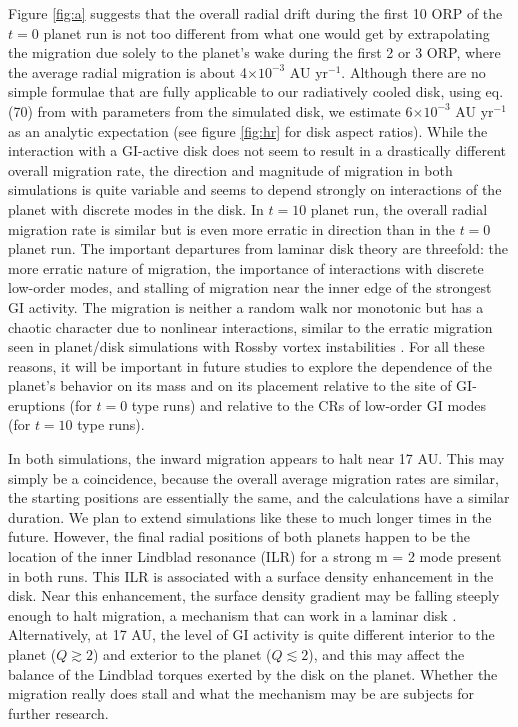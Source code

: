 \documentclass[12pt,manuscript,authoryear]{aastex}
\begin{document}
Figure \ref{fig:a} suggests that the overall radial drift during the first 10 ORP of the $t = 0$ planet run is not too
different from what one would get by extrapolating the migration due solely to the planet's wake during the first 2 or 3
ORP, where the average radial migration is about 4$\times10^{-3}$ AU yr$^{-1}$. Although there are no simple formulae
that are fully applicable to our radiatively cooled disk, using eq. (70) from \citet{tanaka2002} with parameters from
the simulated disk, we estimate 6$\times10^{-3}$ AU yr$^{-1}$ as an analytic expectation (see figure \ref{fig:hr} for
disk aspect ratios). While the interaction with a GI-active disk does not seem to result in a drastically different
overall migration rate, the direction and magnitude of migration in both simulations is quite variable and seems to
depend strongly on interactions of the planet with discrete modes in the disk. In $t = 10$ planet run, the overall
radial migration rate is similar but is even more erratic in direction than in the $t = 0$ planet run. The important
departures from laminar disk theory are threefold: the more erratic nature of migration, the importance of interactions
with discrete low-order modes, and stalling of migration near the inner edge of the strongest GI activity. The migration
is neither a random walk nor monotonic but has a chaotic character due to nonlinear interactions, similar to the erratic
migration seen in planet/disk simulations with Rossby vortex instabilities \citep{yu2010}. For all these reasons,
it will be important in future studies to explore the dependence of the planet's behavior on its mass and on its
placement relative to the site of GI-eruptions (for $t = 0$ type runs) and relative to the CRs of low-order GI modes
(for $t = 10$ type runs).

In both simulations, the inward migration appears to halt near 17 AU. This may simply be a coincidence, because the
overall average migration rates are similar, the starting positions are essentially the same, and the calculations have
a similar duration. We plan to extend simulations like these to much longer times in the future. However, the final
radial positions of both planets happen to be the location of the inner Lindblad resonance (ILR) for a strong m = 2 mode
present in both runs. This ILR is associated with a surface density enhancement in the disk. Near this enhancement, the
surface density gradient may be falling steeply enough to halt migration, a mechanism that can work in a laminar disk
\citep{paardekooper2009}.  Alternatively, at 17 AU, the level of GI activity is quite different interior to the planet
($Q \gtrsim 2$) and exterior to the planet ($Q \lesssim 2$), and this may affect the balance of the Lindblad torques
exerted by the disk on the planet. Whether the migration really does stall and what the mechanism may be are subjects
for further research.
\end{document}
